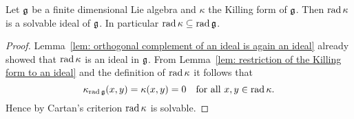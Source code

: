 \begin{cor}\label{cor: rad kappa is a solvable ideal}
 Let $\mathfrak{g}$ be a finite dimensional Lie algebra and $\kappa$ the Killing form of $\mathfrak{g}$. Then $\operatorname{rad} \kappa$ is a solvable ideal of $\mathfrak{g}$. In particular $\operatorname{rad} \kappa \subseteq \operatorname{rad} \mathfrak{g}$.
\end{cor}
\begin{proof}
 Lemma~\ref{lem: orthogonal complement of an ideal is again an ideal} already showed that $\operatorname{rad} \kappa$ is an ideal in $\mathfrak{g}$. From Lemma~\ref{lem: restriction of the Killing form to an ideal} and the definition of $\operatorname{rad} \kappa$ it follows that 
 \[
  \kappa_{\operatorname{rad} \mathfrak{g}}(x,y) = \kappa(x,y) = 0 \quad \text{for all $x,y \in \operatorname{rad} \kappa$}.
 \]
 Hence by Cartan’s criterion $\operatorname{rad} \kappa$ is solvable.
\end{proof}
